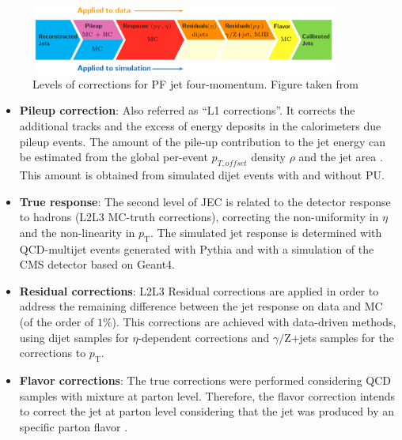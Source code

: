 \begin{figure}[ht]%
  \begin{center}
    \includegraphics[width=0.9\textwidth]{figuras/Chapter3/JEC_levels.png}
    \caption{Levels of corrections for PF jet four-momentum. Figure taken from \cite{JESandJER}}
    \label{fig:JEC_levels}
  \end{center}
\end{figure}
\begin{itemize}
 \item \textbf{Pileup correction}: Also referred as ``L1 corrections''. It corrects the additional tracks and the excess of energy deposits
in the calorimeters due pileup events. The amount of the pile-up contribution
to the jet energy can be estimated from the global per-event $p_{T,offset}$ density 
$\rho$ and the jet area \cite{JECpileup}. This amount is obtained from 
simulated dijet events with and without PU.
 \item \textbf{True response}: The second level of JEC is related to the detector response to hadrons (L2L3 MC-truth corrections), correcting
the non-uniformity in $\eta$ and the non-linearity in $p_{\textrm{T}}$. The simulated jet response is determined
with QCD-multijet events generated with Pythia and with a simulation of the CMS detector based
on Geant4.
 \item \textbf{Residual corrections}: L2L3 Residual corrections are applied in order to address the remaining difference
between the jet response on data and MC (of the order of $1 \%$). This corrections are achieved with data-driven methods, using
dijet samples for $\eta$-dependent corrections and $\gamma /$Z+jets samples for the corrections to $p_{\textrm{T}}$. 
 \item \textbf{Flavor corrections}: The true corrections were performed considering QCD samples with mixture at parton level. 
 Therefore, the flavor correction intends to correct the jet at parton level considering that the jet was produced 
 by an specific parton flavor \cite{CMS-PAS-JME-07-002}. 

\end{itemize}

